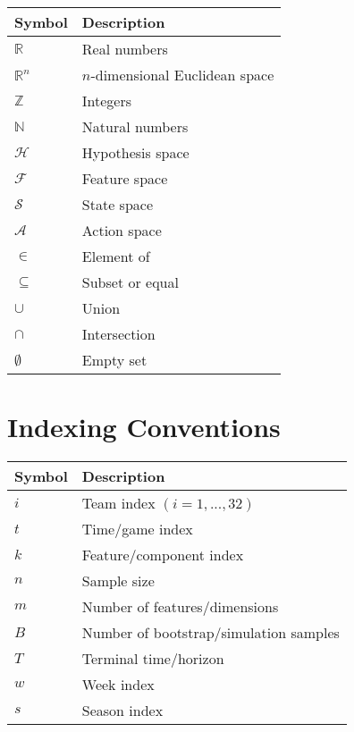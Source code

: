 \begin{tabular}{ll}
\toprule
\textbf{Symbol} & \textbf{Description} \\
\midrule
$\mathbb{R}$ & Real numbers \\
$\mathbb{R}^n$ & $n$-dimensional Euclidean space \\
$\mathbb{Z}$ & Integers \\
$\mathbb{N}$ & Natural numbers \\
$\mathcal{H}$ & Hypothesis space \\
$\mathcal{F}$ & Feature space \\
$\mathcal{S}$ & State space \\
$\mathcal{A}$ & Action space \\
$\in$ & Element of \\
$\subseteq$ & Subset or equal \\
$\cup$ & Union \\
$\cap$ & Intersection \\
$\emptyset$ & Empty set \\
\bottomrule
\end{tabular}

\section*{Indexing Conventions}

\begin{tabular}{ll}
\toprule
\textbf{Symbol} & \textbf{Description} \\
\midrule
$i$ & Team index $(i = 1, ..., 32)$ \\
$t$ & Time/game index \\
$k$ & Feature/component index \\
$n$ & Sample size \\
$m$ & Number of features/dimensions \\
$B$ & Number of bootstrap/simulation samples \\
$T$ & Terminal time/horizon \\
$w$ & Week index \\
$s$ & Season index \\
\bottomrule
\end{tabular}